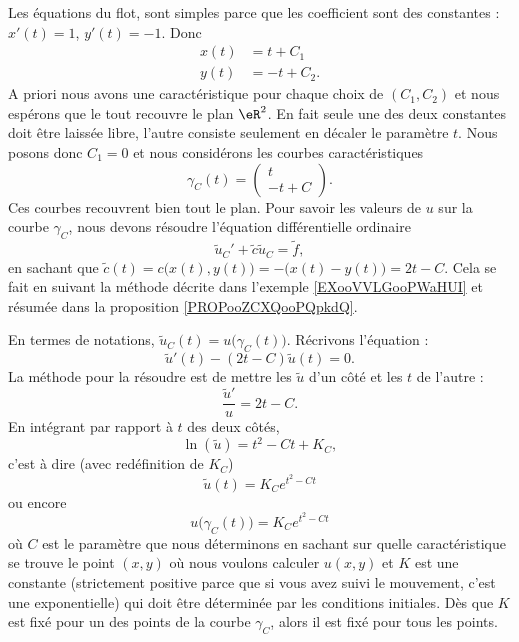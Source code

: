 Les équations du flot, sont simples parce que les coefficient sont des constantes : \( x'(t)=1\), \( y'(t)=-1\). Donc
\begin{subequations}
    \begin{align}
        x(t)&=t+C_1\\
        y(t)&=-t+C_2.
    \end{align}
\end{subequations}
A priori nous avons une caractéristique pour chaque choix de \( (C_1,C_2)\) et nous espérons que le tout recouvre le plan \( \eR^2\). En fait seule une des deux constantes doit être laissée libre, l'autre consiste seulement en décaler le paramètre \( t\). Nous posons donc \( C_1=0\) et nous considérons les courbes caractéristiques
\begin{equation}
    \gamma_C(t)=\begin{pmatrix}
        t    \\ 
        -t+C    
    \end{pmatrix}.
\end{equation}
Ces courbes recouvrent bien tout le plan. Pour savoir les valeurs de \( u\) sur la courbe \( \gamma_C\), nous devons résoudre l'équation différentielle ordinaire 
\begin{equation}
    \tilde u_C'+\tilde c\tilde u_C=\tilde f,
\end{equation}
en sachant que \( \tilde c(t)=c\big( x(t),y(t) \big)=-\big( x(t)-y(t) \big)=2t-C\). Cela se fait en suivant la méthode décrite dans l'exemple \ref{EXooVVLGooPWaHUI} et résumée dans la proposition \ref{PROPooZCXQooPQpkdQ}.

En termes de notations, \( \tilde u_C(t)=u\big( \gamma_C(t) \big)\). Récrivons l'équation :
\begin{equation}
    \tilde u'(t)-(2t-C)\tilde u(t)=0.
\end{equation}
La méthode pour la résoudre est de mettre les \( \tilde u\) d'un côté et les \( t\) de l'autre :
\begin{equation}
    \frac{ \tilde u' }{ u }=2t-C.
\end{equation}
En intégrant par rapport à \( t\) des deux côtés,
\begin{equation}
    \ln(\tilde u)=t^2-Ct+K_C,
\end{equation}
c'est à dire (avec redéfinition de \( K_C\))
\begin{equation}     
    \tilde u(t)=K_C e^{t^2-Ct}
\end{equation}
ou encore
\begin{equation}   \label{EQooSSTJooEQfRnP}
    u\big( \gamma_C(t) \big)=K_C e^{t^2-Ct}
\end{equation}
où \( C\) est le paramètre que nous déterminons en sachant sur quelle caractéristique se trouve le point \( (x,y)\) où nous voulons calculer \( u(x,y)\) et \( K\) est une constante (strictement positive parce que si vous avez suivi le mouvement, c'est une exponentielle) qui doit être déterminée par les conditions initiales. Dès que \( K\) est fixé pour un des points de la courbe \( \gamma_C\), alors il est fixé pour tous les points.

